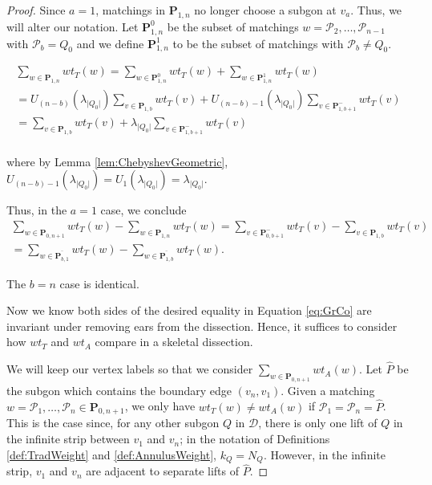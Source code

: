 \documentclass[12pt]{article}
\theoremstyle{remark}
\newcommand*{\pathset}[2]{\mathbf{P}_{#1,#2}}
\newcommand*{\poly}[1]{\mathcal{P}_{#1}}
\newcommand*{\D}{\mathcal{D}}
\begin{document}
\begin{proof}
Since $a = 1$, matchings in $\pathset{1}{n}$ no longer choose a subgon at $v_a$. Thus, we will alter our notation. Let $\pathset{1}{n}^0$ be the subset of matchings $w = \poly{2},\ldots,\poly{n-1}$ with $\poly{b} = Q_0$ and we define $\pathset{1}{n}^1$ to be the subset of matchings with $\poly{b} \neq Q_0$. 

\begin{align*}
  \sum_{w \in \pathset{1}{n}} wt_T(w)  =    \sum_{w \in \pathset{1}{n}^0} wt_T(w) + \sum_{w \in \pathset{1}{n}^1} wt_T(w)\\
  = U_{(n-b)}(\lambda_{\vert Q_0 \vert}) \sum_{v \in \pathset{1}{b}} wt_T(v) + U_{(n-b) - 1}(\lambda_{\vert Q_0 \vert}) \sum_{v \in \pathset{1}{b+1}^-} wt_T(v)\\
  =  \sum_{v \in \pathset{1}{b}} wt_T(v) + \lambda_{\vert Q_0 \vert} \sum_{v \in \pathset{1}{b+1}^-} wt_T(v)\\
\end{align*}

where by Lemma \ref{lem:ChebyshevGeometric}, $ U_{ (n-b) - 1}(\lambda_{\vert Q_0 \vert}) = U_1(\lambda_{\vert Q_0\vert}) = \lambda_{\vert Q_0 \vert}$. 

Thus, in the $a = 1$ case, we conclude \begin{align*}
 \sum_{w \in \pathset{0}{n+1}} wt_T(w) - \sum_{w \in \pathset{1}{n}} wt_T(w)  =  \sum_{v \in \pathset{0}{b+1}^-} wt_T(v) - \sum_{v \in \pathset{1}{b}} wt_T(v)\\
 = \sum_{w \in  \overline{\pathset{b}{1}}}wt_T(w)  - \sum_{w \in \overline{\pathset{1}{b}}}wt_T(w).
\end{align*}

The $b = n$ case is identical. 

Now we know both sides of the desired equality in Equation \ref{eq:GrCo} are invariant under removing ears from the dissection. Hence, it suffices to consider how $wt_T$ and $wt_A$ compare in a skeletal dissection.


We will keep our vertex labels so that we consider $\sum_{w \in \pathset{0}{n+1}} wt_A(w)$. Let $\hat{P}$ be the subgon which contains the boundary edge $(v_n,v_1)$. Given a matching $w = \poly{1},\ldots,\poly{n} \in \pathset{0}{n+1}$, we only have $wt_T(w) \neq wt_A(w)$ if $\poly{1} = \poly{n} = \hat{P} $. This is the case since, for any other subgon $Q$ in $\D$, there is only one lift of $Q$ in the infinite strip between $v_1$ and $v_n$; in the notation of Definitions \ref{def:TradWeight} and \ref{def:AnnulusWeight}, $k_Q = N_Q$. However, in the infinite strip, $v_1$ and $v_n$ are adjacent to separate lifts of $\hat{P}$. 


\end{proof}
\end{document}
